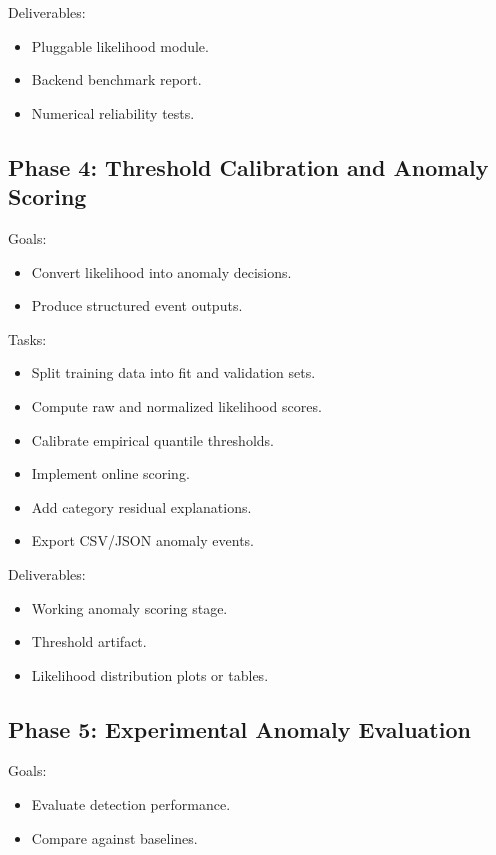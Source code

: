 \documentclass[11pt,a4paper]{article}
\begin{document}
Deliverables:

\begin{itemize}
  \item Pluggable likelihood module.
  \item Backend benchmark report.
  \item Numerical reliability tests.
\end{itemize}

\subsection{Phase 4: Threshold Calibration and Anomaly Scoring}

Goals:

\begin{itemize}
  \item Convert likelihood into anomaly decisions.
  \item Produce structured event outputs.
\end{itemize}

Tasks:

\begin{itemize}
  \item Split training data into fit and validation sets.
  \item Compute raw and normalized likelihood scores.
  \item Calibrate empirical quantile thresholds.
  \item Implement online scoring.
  \item Add category residual explanations.
  \item Export CSV/JSON anomaly events.
\end{itemize}

Deliverables:

\begin{itemize}
  \item Working anomaly scoring stage.
  \item Threshold artifact.
  \item Likelihood distribution plots or tables.
\end{itemize}

\subsection{Phase 5: Experimental Anomaly Evaluation}

Goals:

\begin{itemize}
  \item Evaluate detection performance.
  \item Compare against baselines.
\end{itemize}
\end{document}
